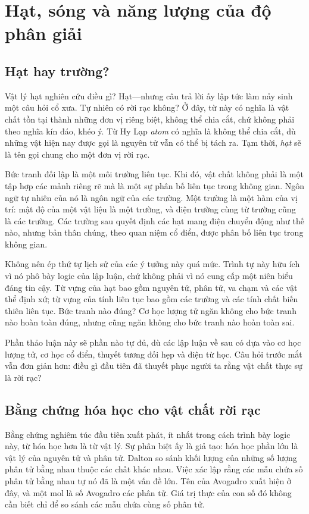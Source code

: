 \chapter{Hạt, sóng và năng lượng của độ phân giải}

\section{Hạt hay trường?}

Vật lý hạt nghiên cứu điều gì? Hạt---nhưng câu trả lời ấy lập tức làm nảy sinh một câu hỏi cổ xưa. Tự nhiên có rời rạc không? Ở đây, từ này có nghĩa là vật chất tồn tại thành những đơn vị riêng biệt, không thể chia cắt, chứ không phải theo nghĩa kín đáo, khéo ý. Từ Hy Lạp \emph{atom} có nghĩa là không thể chia cắt, dù những vật hiện nay được gọi là nguyên tử vẫn có thể bị tách ra. Tạm thời, \emph{hạt} sẽ là tên gọi chung cho một đơn vị rời rạc.

Bức tranh đối lập là một môi trường liên tục. Khi đó, vật chất không phải là một tập hợp các mảnh riêng rẽ mà là một sự phân bố liên tục trong không gian. Ngôn ngữ tự nhiên của nó là ngôn ngữ của các trường. Một trường là một hàm của vị trí: mật độ của một vật liệu là một trường, và điện trường cùng từ trường cũng là các trường. Các trường sau quyết định các hạt mang điện chuyển động như thế nào, nhưng bản thân chúng, theo quan niệm cổ điển, được phân bố liên tục trong không gian.

Không nên ép thứ tự lịch sử của các ý tưởng này quá mức. Trình tự này hữu ích vì nó phô bày logic của lập luận, chứ không phải vì nó cung cấp một niên biểu đáng tin cậy. Từ vựng của hạt bao gồm nguyên tử, phân tử, va chạm và các vật thể định xứ; từ vựng của tính liên tục bao gồm các trường và các tính chất biến thiên liên tục. Bức tranh nào đúng? Cơ học lượng tử ngăn không cho bức tranh nào hoàn toàn đúng, nhưng cũng ngăn không cho bức tranh nào hoàn toàn sai.

Phần thảo luận này sẽ phần nào tự đủ, dù các lập luận về sau có dựa vào cơ học lượng tử, cơ học cổ điển, thuyết tương đối hẹp và điện từ học. Câu hỏi trước mắt vẫn đơn giản hơn: điều gì đầu tiên đã thuyết phục người ta rằng vật chất thực sự là rời rạc?

\section{Bằng chứng hóa học cho vật chất rời rạc}

Bằng chứng nghiêm túc đầu tiên xuất phát, ít nhất trong cách trình bày logic này, từ hóa học hơn là từ vật lý. Sự phân biệt ấy là giả tạo: hóa học phần lớn là vật lý của nguyên tử và phân tử. Dalton so sánh khối lượng của những số lượng phân tử bằng nhau thuộc các chất khác nhau. Việc xác lập rằng các mẫu chứa số phân tử bằng nhau tự nó đã là một vấn đề lớn. Tên của Avogadro xuất hiện ở đây, và một mol là số Avogadro các phân tử. Giá trị thực của con số đó không cần biết chỉ để so sánh các mẫu chứa cùng số phân tử.

